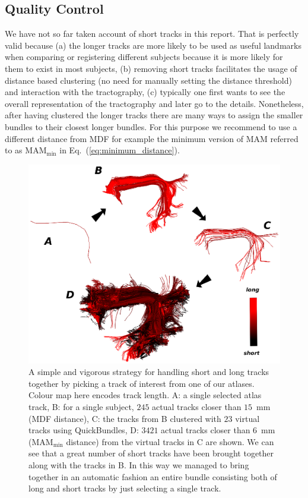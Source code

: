 \documentclass{bioinfo}
\begin{document}
\subsection{Quality Control\label{sub:short_tracks}}

We have not so far taken account of short tracks in this report. That is
perfectly valid because (a) the longer tracks are more likely to be used
as useful landmarks when comparing or registering different subjects
because it is more likely for them to exist in most subjects, (b)
removing short tracks facilitates the usage of distance based clustering
(no need for manually setting the distance threshold) and interaction
with the tractography, (c) typically one first wants to see the overall
representation of the tractography and later go to the
details. Nonetheless, after having clustered the longer tracks there are
many ways to assign the smaller bundles to their closest longer
bundles. For this purpose we recommend to use a different distance from
MDF for example the minimum version of MAM referred to as
$\textrm{MAM}_{\textrm{min}}$ in Eq.~(\ref{eq:minimum_distance}).

%
\begin{figure}
\begin{centering}
\includegraphics[scale=0.65]{Figures/Fig_10_arcuate_small_fibers}
\par\end{centering}
\caption{A simple and vigorous strategy for handling short and long
  tracks together by picking a track of interest from one of our
  atlases. Colour map here encodes track length. A: a single selected
  atlas track, B: for a single subject, $245$ actual tracks closer than
  $15$~mm (MDF distance), C: the tracks from B clustered with $23$
  virtual tracks using QuickBundles, D: $\num{3421}$ actual tracks closer than $6$~mm
  ($\textrm{MAM}_{\textrm{min}}$ distance) from the virtual tracks in C
  are shown. We can see that a great number of short tracks have been
  brought together along with the tracks in B. In this way we managed to
  bring together in an automatic fashion an entire bundle consisting both of long and short
  tracks by just selecting a single track.\label{Flo:arcuate_close}}
\end{figure}
\end{document}
